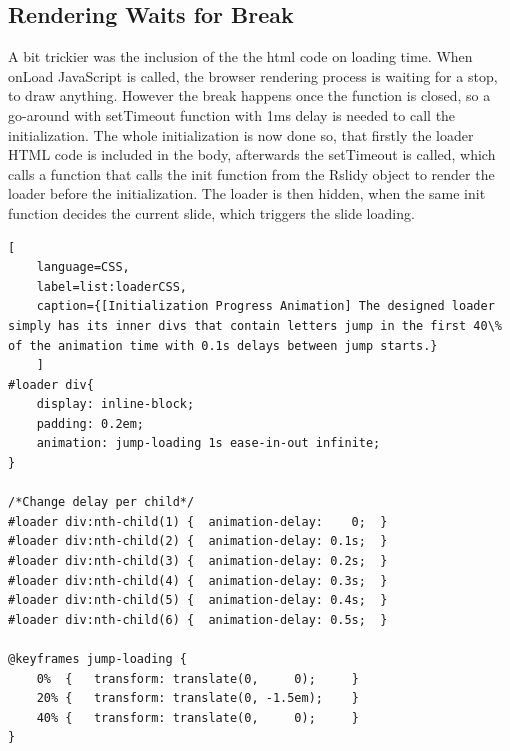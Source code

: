 \subsection{Rendering Waits for Break} %
\label{sub:rendering_waits_for_break}

A bit trickier was the inclusion of the the html code on loading time. When onLoad JavaScript is called, the browser rendering process is waiting for a stop, to draw anything. However the break happens once the function is closed, so a go-around with setTimeout function with 1ms delay is needed to call the initialization. The whole initialization is now done so, that firstly the loader HTML code is included in the body, afterwards the setTimeout is called, which calls a function that calls the init function from the Rslidy object to render the loader before the initialization. The loader is then hidden, when the same init function decides the current slide, which triggers the slide loading.



\begin{minipage}{\linewidth}
	\begin{lstlisting}[
	language=CSS,
	label=list:loaderCSS,
	caption={[Initialization Progress Animation] The designed loader simply has its inner divs that contain letters jump in the first 40\% of the animation time with 0.1s delays between jump starts.}
	]
#loader div{
	display: inline-block;
	padding: 0.2em;
	animation: jump-loading 1s ease-in-out infinite;
}

/*Change delay per child*/
#loader div:nth-child(1) {  animation-delay: 	0;	}
#loader div:nth-child(2) {  animation-delay: 0.1s;	}
#loader div:nth-child(3) {  animation-delay: 0.2s;	}
#loader div:nth-child(4) {  animation-delay: 0.3s;	}
#loader div:nth-child(5) {  animation-delay: 0.4s;	}
#loader div:nth-child(6) {  animation-delay: 0.5s;	}

@keyframes jump-loading {
	0%	{	transform: translate(0,		0);		}
	20% {	transform: translate(0, -1.5em);	}
	40% {	transform: translate(0,		0);		}
}
	\end{lstlisting}
\end{minipage}

